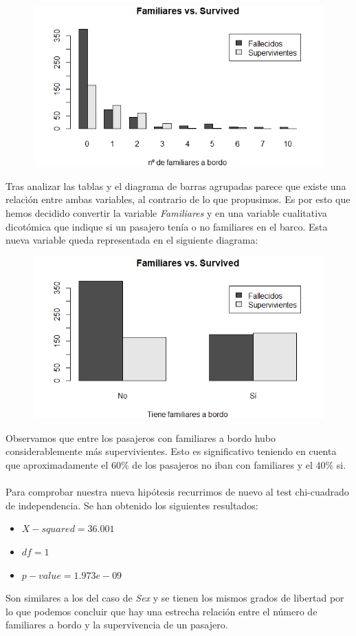\documentclass{article}
\begin{document}
\begin{figure}[!h]
    \centering
    \includegraphics[width=0.7\linewidth]{content/fam_surv1.png}
\end{figure}
\noindent Tras analizar las tablas y el diagrama de barras agrupadas parece que existe una relación entre ambas variables, al contrario de lo que propusimos. Es por esto que hemos decidido convertir la variable \textit{Familiares} y en una variable cualitativa dicotómica que indique si un pasajero tenía o no familiares en el barco. Esta nueva variable queda representada en el siguiente diagrama:
\newpage
\begin{figure}[!h]
    \centering
    \includegraphics[width=0.7\linewidth]{content/fam_surv2.png}
\end{figure}

\noindent Observamos que entre los pasajeros con familiares a bordo hubo considerablemente más supervivientes. Esto es significativo teniendo en cuenta que aproximadamente el $60\%$ de los pasajeros no iban con familiares y el $40\%$ si.\\\\
Para comprobar nuestra nueva hipótesis recurrimos de nuevo al test chi-cuadrado de independencia. Se han obtenido los siguientes resultados:
\begin{itemize}
    \item $X-squared =36.001 $
    \item $df = 1$
    \item $p-value = 1.973e-09$
\end{itemize}
\noindent Son similares a los del caso de \textit{Sex} y se tienen los mismos grados de libertad por lo que podemos concluir que hay una estrecha relación entre el número de familiares a bordo y la supervivencia de un pasajero.
\newpage
\end{document}
